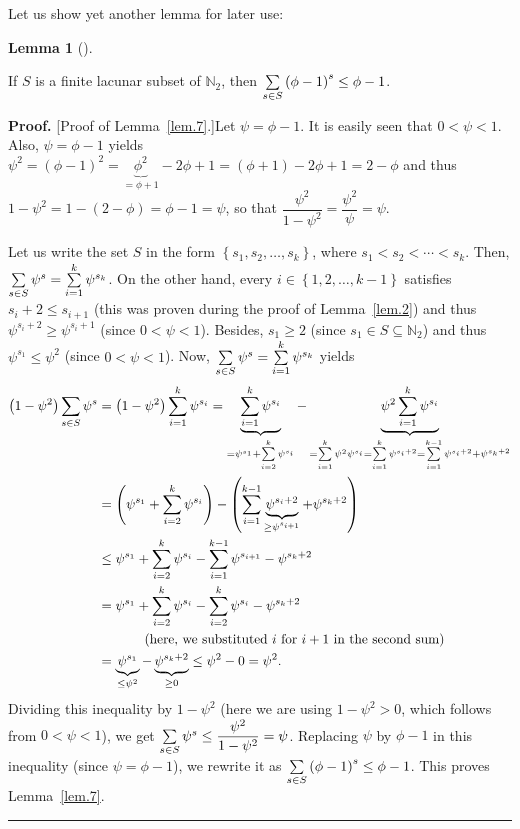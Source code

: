 \documentclass[numbers=enddot,12pt,final,onecolumn,notitlepage]{scrartcl}%
\numberwithin{exer}{section}
\theoremstyle{definition}
\newtheorem{lem}[theo]{Lemma}
\newenvironment{lemma}[1][]
{\begin{lem}[#1]\begin{leftbar}}
{\end{leftbar}\end{lem}}
\newenvironment{proof}[1][Proof]{\noindent\textbf{#1.} }{\ \rule{0.5em}{0.5em}}
\let\sumnonlimits\sum
\renewcommand{\sum}{\sumnonlimits\limits}
\begin{document}
Let us show yet another lemma for later use:

\begin{lemma}
\label{lem.7} If $S$ is a finite lacunar subset of $\mathbb{N}_{2}$, then
$\sum\limits_{s\in S}\left(  \phi-1\right)  ^{s}\leq\phi-1$.
\end{lemma}

\begin{proof}
[Proof of Lemma~\ref{lem.7}.]Let $\psi=\phi-1$. It is easily seen that
$0<\psi<1$. Also, $\psi=\phi-1$ yields $\psi^{2}=\left(  \phi-1\right)
^{2}=\underbrace{\phi^{2}}_{=\phi+1}-2\phi+1=\left(  \phi+1\right)
-2\phi+1=2-\phi$ and thus $1-\psi^{2}=1-\left(  2-\phi\right)  =\phi-1=\psi$,
so that $\dfrac{\psi^{2}}{1-\psi^{2}}=\dfrac{\psi^{2}}{\psi}=\psi$.

Let us write the set $S$ in the form $\left\{  s_{1},s_{2},\ldots
,s_{k}\right\}  $, where $s_{1}<s_{2}<\cdots<s_{k}$. Then, $\sum\limits_{s\in
S}\psi^{s}=\sum\limits_{i=1}^{k}\psi^{s_{k}}$. On the other hand, every
$i\in\left\{  1,2,\ldots,k-1\right\}  $ satisfies $s_{i}+2\leq s_{i+1}$ (this
was proven during the proof of Lemma~\ref{lem.2}) and thus $\psi^{s_{i}+2}%
\geq\psi^{s_{i}+1}$ (since $0<\psi<1$). Besides, $s_{1}\geq2$ (since $s_{1}\in
S\subseteq\mathbb{N}_{2}$) and thus $\psi^{s_{1}}\leq\psi^{2}$ (since
$0<\psi<1$). Now, $\sum\limits_{s\in S}\psi^{s}=\sum\limits_{i=1}^{k}%
\psi^{s_{k}}$ yields%
\begin{align*}
\left(  1-\psi^{2}\right)  \sum\limits_{s\in S}\psi^{s}  &  =\left(
1-\psi^{2}\right)  \sum\limits_{i=1}^{k}\psi^{s_{i}}=\underbrace{\sum
\limits_{i=1}^{k}\psi^{s_{i}}}_{=\psi^{s_{1}}+\sum\limits_{i=2}^{k}\psi
^{s_{i}}}-\underbrace{\psi^{2}\sum\limits_{i=1}^{k}\psi^{s_{i}}}%
_{=\sum\limits_{i=1}^{k}\psi^{2}\psi^{s_{i}}=\sum\limits_{i=1}^{k}\psi
^{s_{i}+2}=\sum\limits_{i=1}^{k-1}\psi^{s_{i}+2}+\psi^{s_{k}+2}}\\
&  =\left(  \psi^{s_{1}}+\sum\limits_{i=2}^{k}\psi^{s_{i}}\right)  -\left(
\sum\limits_{i=1}^{k-1}\underbrace{\psi^{s_{i}+2}}_{\geq\psi^{s_{i+1}}}%
+\psi^{s_{k}+2}\right) \\
&  \leq\psi^{s_{1}}+\sum\limits_{i=2}^{k}\psi^{s_{i}}-\sum\limits_{i=1}%
^{k-1}\psi^{s_{i+1}}-\psi^{s_{k}+2}\\
&  =\psi^{s_{1}}+\sum\limits_{i=2}^{k}\psi^{s_{i}}-\sum\limits_{i=2}^{k}%
\psi^{s_{i}}-\psi^{s_{k}+2}\\
&  \ \ \ \ \ \ \ \ \ \ \left(  \text{here, we substituted }i\text{ for
}i+1\text{ in the second sum}\right) \\
&  =\underbrace{\psi^{s_{1}}}_{\leq\psi^{2}}-\underbrace{\psi^{s_{k}+2}}%
_{\geq0}\leq\psi^{2}-0=\psi^{2}.
\end{align*}
Dividing this inequality by $1-\psi^{2}$ (here we are using $1-\psi^{2}>0$,
which follows from $0<\psi<1$), we get $\sum\limits_{s\in S}\psi^{s}\leq
\dfrac{\psi^{2}}{1-\psi^{2}}=\psi$. Replacing $\psi$ by $\phi-1$ in this
inequality (since $\psi=\phi-1$), we rewrite it as $\sum\limits_{s\in
S}\left(  \phi-1\right)  ^{s}\leq\phi-1$. This proves Lemma~\ref{lem.7}.
\end{proof}
\end{document}
